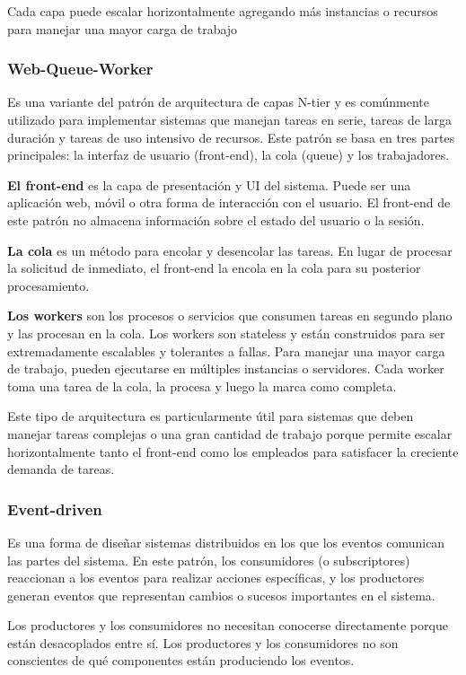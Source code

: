 \documentclass{article}
\begin{document}
		Cada capa puede escalar horizontalmente agregando más instancias o recursos para manejar una mayor carga de trabajo
		
		
		\subsubsection{Web-Queue-Worker}
		Es una variante del patrón de arquitectura de capas N-tier y es comúnmente utilizado para implementar sistemas que manejan tareas en serie, tareas de larga duración y tareas de uso intensivo de recursos. Este patrón se basa en tres partes principales: la interfaz de usuario (front-end), la cola (queue) y los trabajadores.
		
		\textbf{El front-end} es la capa de presentación y UI del sistema. Puede ser una aplicación web, móvil o otra forma de interacción con el usuario. El front-end de este patrón no almacena información sobre el estado del usuario o la sesión.
		
		\textbf{La cola} es un método para encolar y desencolar las tareas. En lugar de procesar la solicitud de inmediato, el front-end la encola en la cola para su posterior procesamiento. 
		
		\textbf{Los workers} son los procesos o servicios que consumen tareas en segundo plano y las procesan en la cola. Los workers son stateless y están construidos para ser extremadamente escalables y tolerantes a fallas. Para manejar una mayor carga de trabajo, pueden ejecutarse en múltiples instancias o servidores. Cada worker toma una tarea de la cola, la procesa y luego la marca como completa.
		
		Este tipo de arquitectura es particularmente útil para sistemas que deben manejar tareas complejas o una gran cantidad de trabajo porque permite escalar horizontalmente tanto el front-end como los empleados para satisfacer la creciente demanda de tareas.
		
		
		\subsubsection{Event-driven}
		Es una forma de diseñar sistemas distribuidos en los que los eventos comunican las partes del sistema. En este patrón, los consumidores (o subscriptores) reaccionan a los eventos para realizar acciones específicas, y los productores generan eventos que representan cambios o sucesos importantes en el sistema.
		
		Los productores y los consumidores no necesitan conocerse directamente porque están desacoplados entre sí. Los productores y los consumidores no son conscientes de qué componentes están produciendo los eventos.
		
\end{document}
